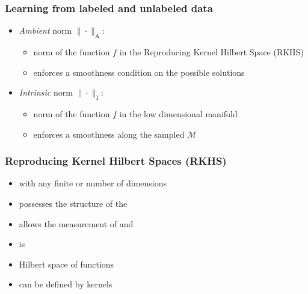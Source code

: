 \begin{frame}
  \frametitle{Learning from labeled and unlabeled data \cont}
  
  
  \begin{center}
  \end{center}
  \vspace{.15cm}
  
  
  \begin{itemize}
    \item \emph{Ambient} norm $\|\cdot\|_\text{A}$: 
      \begin{itemize}
        \item norm of the function $f$ in the Reproducing Kernel Hilbert Space (RKHS)
        \item enforces a smoothness condition on the possible solutions \\[.25cm]
      \end{itemize}
    \item \emph{Intrinsic} norm $\|\cdot\|_\text{I}$:
      \begin{itemize}
        \item norm of the function $f$ in the low dimensional manifold
        \item enforces a smoothness along the sampled $\mathcal{M}$
      \end{itemize}
  \end{itemize}
\end{frame}


\begin{frame}
  \frametitle{Reproducing Kernel Hilbert Spaces (RKHS)}


  \begin{itemize}
    \item {} with any finite or  number of dimensions
    \item possesses the structure of the 
    \item allows the measurement of  and 
    \item is  \\[.3cm]
  \end{itemize}
  \pause


  \begin{itemize}
    \item Hilbert space of functions
    \item can be defined by kernels
  \end{itemize}
\end{frame}


